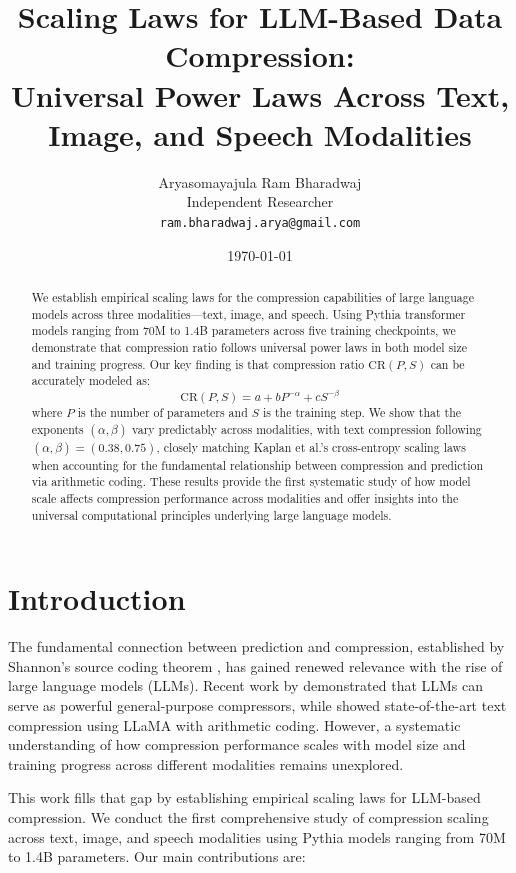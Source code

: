 \documentclass[11pt]{article}
\title{Scaling Laws for LLM-Based Data Compression:\\Universal Power Laws Across Text, Image, and Speech Modalities}
\author{Aryasomayajula Ram Bharadwaj \\
Independent Researcher \\
\texttt{ram.bharadwaj.arya@gmail.com}}
\date{\today}
\begin{document}
\maketitle

\begin{abstract}
We establish empirical scaling laws for the compression capabilities of large language models across three modalities—text, image, and speech. Using Pythia transformer models ranging from 70M to 1.4B parameters across five training checkpoints, we demonstrate that compression ratio follows universal power laws in both model size and training progress. Our key finding is that compression ratio $\mathrm{CR}(P,S)$ can be accurately modeled as:
\[
\mathrm{CR}(P,S) = a + b P^{-\alpha} + c S^{-\beta}
\]
where $P$ is the number of parameters and $S$ is the training step. We show that the exponents $(\alpha, \beta)$ vary predictably across modalities, with text compression following $(\alpha, \beta) = (0.38, 0.75)$, closely matching Kaplan et al.'s cross-entropy scaling laws when accounting for the fundamental relationship between compression and prediction via arithmetic coding. These results provide the first systematic study of how model scale affects compression performance across modalities and offer insights into the universal computational principles underlying large language models.
\end{abstract}

\section{Introduction}

The fundamental connection between prediction and compression, established by Shannon's source coding theorem \citep{shannon1948mathematical}, has gained renewed relevance with the rise of large language models (LLMs). Recent work by \citet{deletang2023compression} demonstrated that LLMs can serve as powerful general-purpose compressors, while \citet{kaushik2023llmzip} showed state-of-the-art text compression using LLaMA with arithmetic coding. However, a systematic understanding of how compression performance scales with model size and training progress across different modalities remains unexplored.

This work fills that gap by establishing empirical scaling laws for LLM-based compression. We conduct the first comprehensive study of compression scaling across text, image, and speech modalities using Pythia models \citep{biderman2023pythia} ranging from 70M to 1.4B parameters. Our main contributions are:
\end{document}

